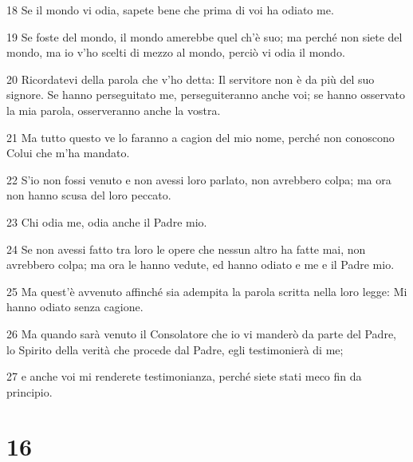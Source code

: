 \par 18 Se il mondo vi odia, sapete bene che prima di voi ha odiato me.
\par 19 Se foste del mondo, il mondo amerebbe quel ch'è suo; ma perché non siete del mondo, ma io v'ho scelti di mezzo al mondo, perciò vi odia il mondo.
\par 20 Ricordatevi della parola che v'ho detta: Il servitore non è da più del suo signore. Se hanno perseguitato me, perseguiteranno anche voi; se hanno osservato la mia parola, osserveranno anche la vostra.
\par 21 Ma tutto questo ve lo faranno a cagion del mio nome, perché non conoscono Colui che m'ha mandato.
\par 22 S'io non fossi venuto e non avessi loro parlato, non avrebbero colpa; ma ora non hanno scusa del loro peccato.
\par 23 Chi odia me, odia anche il Padre mio.
\par 24 Se non avessi fatto tra loro le opere che nessun altro ha fatte mai, non avrebbero colpa; ma ora le hanno vedute, ed hanno odiato e me e il Padre mio.
\par 25 Ma quest'è avvenuto affinché sia adempita la parola scritta nella loro legge: Mi hanno odiato senza cagione.
\par 26 Ma quando sarà venuto il Consolatore che io vi manderò da parte del Padre, lo Spirito della verità che procede dal Padre, egli testimonierà di me;
\par 27 e anche voi mi renderete testimonianza, perché siete stati meco fin da principio.

\chapter{16}

